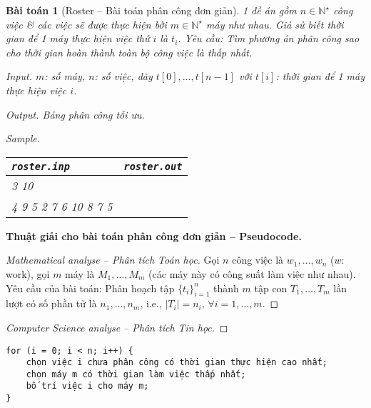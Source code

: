 \documentclass{article}
\newtheorem{baitoan}{Bài toán}
\begin{document}
\begin{baitoan}[Roster -- Bài toán phân công đơn giản]
	1 đề án gồm $n\in\mathbb{N}^\star$ công việc \& các việc sẽ được thực hiện bởi $m\in\mathbb{N}^\star$ máy như nhau. Giả sử biết thời gian để 1 máy thực hiện việc thứ $i$  là $t_i$. Yêu cầu: Tìm phương án phân công sao cho thời gian hoàn thành toàn bộ công việc là thấp nhất.
	\item {\sf Input.} $m$: số máy, $n$: số việc, dãy $t[0],\ldots,t[n-1]$ với $t[i]$: thời gian để 1 máy thực hiện việc $i$.
	\item {\sf Output.} Bảng phân công tối ưu.
	\item {\sf Sample.}
	\begin{table}[H]
		\centering
		\begin{tabular}{|l|l|}
			\hline
			{\tt roster.inp} & {\tt roster.out} \\
			\hline
			3 10 &  \\
			4 9 5 2 7 6 10 8 7 5 &  \\
			\hline
		\end{tabular}
	\end{table}
\end{baitoan}
\noindent\textbf{\textsf{Thuật giải cho bài toán phân công đơn giản -- Pseudocode.}}
\begin{proof}[Mathematical analyse -- Phân tích Toán học]
	Gọi $n$ công việc là $w_1,\ldots,w_n$ ($w$: work), gọi $m$ máy là $M_1,\ldots,M_m$ (các máy này có công suất làm việc như nhau). Yêu cầu của bài toán: Phân hoạch tập $\{t_i\}_{i=1}^n$ thành $m$ tập con $T_1,\ldots,T_m$ lần lượt có số phần tử là $n_1,\ldots,n_m$, i.e., $|T_i| = n_i$, $\forall i = 1,\ldots,m$.
\end{proof}

\begin{proof}[Computer Science analyse -- Phân tích Tin học]
	
\end{proof}

\begin{verbatim}
for (i = 0; i < n; i++) {
    chọn việc i chưa phân công có thời gian thực hiện cao nhất;
    chọn máy m có thời gian làm việc thấp nhất;
    bố trí việc i cho máy m;
}
\end{verbatim}
\end{document}

